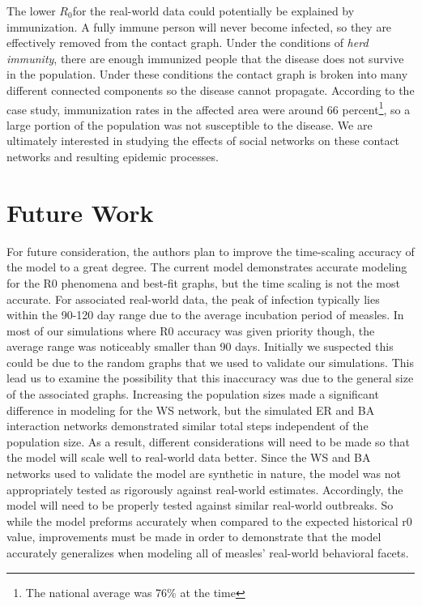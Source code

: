 \documentclass[conference]{IEEEtran}
\newcommand{\ro}{$R_0$}
\begin{document}
The lower \ro for the real-world data could potentially be explained by immunization. A fully immune person will never become infected, so they are effectively removed from the contact graph. Under the conditions of \textit{herd immunity}, there are enough immunized people that the disease does not survive in the population. Under these conditions the contact graph is broken into many different connected components so the disease cannot propagate.\cite{pinkbookMeasles} According to the case study, immunization rates in the affected area were around 66 percent\footnote{The national average was 76\% at the time}, so a large portion of the population was not susceptible to the disease. We are ultimately interested in studying the effects of social networks on these contact networks and resulting epidemic processes. 

\section{Future Work} %
For future consideration, the authors plan to improve the time-scaling accuracy of the model to a great degree. The current model demonstrates accurate modeling for the R0 phenomena and best-fit graphs, but the time scaling is not the most accurate. For associated real-world data,\cite{Jasem2012Elsevier,Mcbrein2003,Sugarman2010} the peak of infection typically lies within the 90-120 day range due to the average incubation period of measles. In most of our simulations where R0 accuracy was given priority though, the average range was noticeably smaller than 90 days. Initially we suspected this could be due to the random graphs that we used to validate our simulations. This lead us to examine the possibility that this inaccuracy was due to the general size of the associated graphs. Increasing the population sizes made a significant difference in modeling for the WS network, but the simulated ER and BA interaction networks demonstrated similar total steps independent of the population size. As a result, different considerations will need to be made so that the model will scale well to real-world data better. Since the WS and BA networks used to validate the model are synthetic in nature, the model was not appropriately tested as rigorously against real-world estimates. Accordingly, the model will need to be properly tested against similar real-world outbreaks. So while the model preforms accurately when compared to the expected historical r0 value, improvements must be made in order to demonstrate that the model accurately generalizes when modeling all of measles' real-world behavioral facets. 
\end{document}
